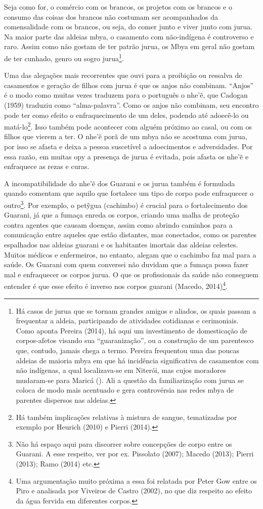 Seja como for, o comércio com os brancos, os projetos com os brancos e o
consumo das coisas dos brancos não costumam ser acompanhados da
comensalidade com os brancos, ou seja, do comer junto e viver junto com
jurua. Na maior parte das aldeias mbya, o casamento com não-indígena é
controverso e raro. Assim como não gostam de ter patrão jurua, os Mbya
em geral não gostam de ter cunhado, genro ou sogro jurua\footnote{Há
casos de jurua que se tornam grandes amigos e aliados, os quais passam
a frequentar a aldeia, participando de atividades cotidianas e
cerimoniais. Como aponta Pereira (2014), há aqui um investimento de
domesticação de corpos-afetos visando sua ``guaranização'', ou a
construção de um parentesco que, contudo, jamais chega a termo. Pereira
frequentou uma das poucas aldeias de maioria mbya em que há incidência
significativa de casamentos com não indígenas, a qual localizava-se em
Niterói, mas cujos moradores mudaram-se para Maricá (). Ali a questão
da familiarização com jurua se coloca de modo mais acentuado e gera
controvérsia nas redes mbya de parentes dispersos nas aldeias.}. 

Uma das alegações mais recorrentes que ouvi para a proibição ou ressalva
de casamentos e geração de filhos com jurua é que os anjos não
combinam. ``Anjos'' é o modo como muitas vezes traduzem para o português
o nhe’\~{e}, que Cadogan (1959) traduziu como ``alma-palavra''. Como os
anjos não combinam, seu encontro pode ter como efeito o enfraquecimento
de um deles, podendo até adoecê-lo ou matá-lo\footnote{Há também
implicações relativas à mistura de sangue, tematizadas por exemplo por
Heurich (2010) e Pierri (2014).}. Isso também pode acontecer com alguém
próximo ao casal, ou com os filhos que vierem a ter. O nhe’\~{e} porã
de um mbya não se acostuma com jurua, por isso se afasta e deixa a
pessoa suscetível a adoecimentos e adversidades. Por essa razão, em
muitas opy a presença de jurua é evitada, pois afasta os nhe’\~{e} e
enfraquece as rezas e curas.

A incompatibilidade do nhe’\~{e} dos Guarani e os jurua também é
formulada quando comentam que aquilo que fortalece um tipo de corpo
pode enfraquecer o outro\footnote{Não há espaço aqui para discorrer
sobre concepções de corpo entre os Guarani. A esse respeito, ver por
ex. Pissolato (2007); Macedo (2013); Pierri (2013); Ramo (2014) etc.}.
Por exemplo, o pet\~{y}gua (cachimbo) é crucial para o fortalecimento
dos Guarani, já que a fumaça enreda os corpos, criando uma malha de
proteção contra agentes que causam doenças, assim como abrindo caminhos
para a comunicação entre aqueles que estão distantes, mas conectados,
como os parentes espalhados nas aldeias guarani e os habitantes
imortais das aldeias celestes. Muitos médicos e enfermeiros, no
entanto, alegam que o cachimbo faz mal para a saúde. Os Guarani com
quem conversei não duvidam que a fumaça possa fazer mal e enfraquecer
os corpos jurua. O que os profissionais da saúde não conseguem entender
é que esse efeito é inverso nos corpos guarani (Macedo,
2014)\footnote{Uma argumentação muito próxima a essa foi relatada por
Peter Gow entre os Piro e analisada por Viveiros de Castro (2002), no
que diz respeito ao efeito da água fervida em diferentes corpos.}. 

